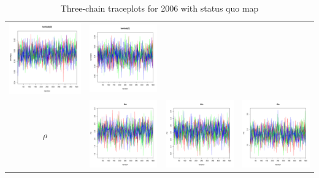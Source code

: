 \documentclass[letter,12pt]{article}
\begin{document}
\begin{table}
\begin{tabular}{cccc}
                        \includegraphics[width=.15\columnwidth]{../graphs/traceplots/2006d0vbar_3.pdf} &
                         \includegraphics[width=.15\columnwidth]{../graphs/traceplots/2006d0wbar_3.pdf} \\
    $\rho$           & \includegraphics[width=.15\columnwidth]{../graphs/traceplots/2006d0v_7.pdf} &
                        \includegraphics[width=.15\columnwidth]{../graphs/traceplots/2006d0vbar_7.pdf} &
                         \includegraphics[width=.15\columnwidth]{../graphs/traceplots/2006d0wbar_7.pdf} \\
\end{tabular}
\caption{Three-chain traceplots for 2006 with status quo map}
\end{table}
\end{document}
